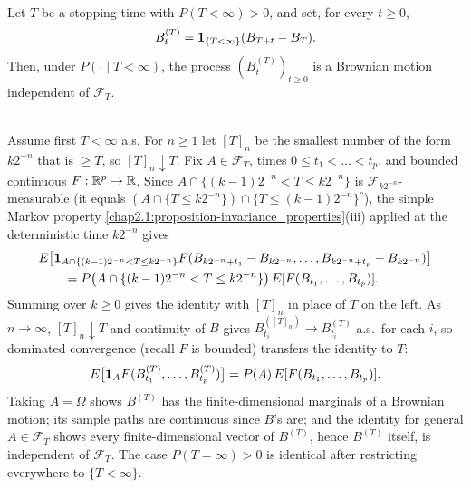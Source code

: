 \begin{theorem} \label{chap2.4:theorem-strong_markov_property}  \\
Let $T$ be a stopping time with $P(T<\infty)>0$, and set, for every $t\ge0$,
$$B_t^{(T)}=\mathbf{1}_{\{T<\infty\}}(B_{T+t}-B_T).$$
Then, under $P(\cdot\mid T<\infty)$, the process $(B_t^{(T)})_{t\ge0}$ is a Brownian motion independent of $\mathcal F_T$.
\end{theorem}
\begin{proofidea}  \\
Assume first $T<\infty$ a.s. For $n\ge1$ let $[T]_n$ be the smallest number of the form $k2^{-n}$ that is $\ge T$, so $[T]_n\downarrow T$. Fix $A\in\mathcal F_T$, times $0\le t_1<\dots<t_p$, and bounded continuous $F:\mathbb{R}^p\to\mathbb{R}$. Since $A\cap\{(k-1)2^{-n}<T\le k2^{-n}\}$ is $\mathcal F_{k2^{-n}}$-measurable (it equals $(A\cap\{T\le k2^{-n}\})\cap\{T\le(k-1)2^{-n}\}^c$), the simple Markov property \ref{chap2.1:proposition-invariance_properties}(iii) applied at the deterministic time $k2^{-n}$ gives
\begin{align*}
&E\big[\mathbf{1}_{A\cap\{(k-1)2^{-n}<T\le k2^{-n}\}}F(B_{k2^{-n}+t_1}-B_{k2^{-n}},\dots,B_{k2^{-n}+t_p}-B_{k2^{-n}})\big] \\
&\qquad=P\big(A\cap\{(k-1)2^{-n}<T\le k2^{-n}\}\big)\,E[F(B_{t_1},\dots,B_{t_p})].
\end{align*}
Summing over $k\ge0$ gives the identity with $[T]_n$ in place of $T$ on the left. As $n\to\infty$, $[T]_n\downarrow T$ and continuity of $B$ gives $B^{([T]_n)}_{t_i}\to B^{(T)}_{t_i}$ a.s.\ for each $i$, so dominated convergence (recall $F$ is bounded) transfers the identity to $T$:
$$E\big[\mathbf{1}_AF(B^{(T)}_{t_1},\dots,B^{(T)}_{t_p})\big]=P(A)\,E[F(B_{t_1},\dots,B_{t_p})].$$
Taking $A=\Omega$ shows $B^{(T)}$ has the finite-dimensional marginals of a Brownian motion; its sample paths are continuous since $B$'s are; and the identity for general $A\in\mathcal F_T$ shows every finite-dimensional vector of $B^{(T)}$, hence $B^{(T)}$ itself, is independent of $\mathcal F_T$. The case $P(T=\infty)>0$ is identical after restricting everywhere to $\{T<\infty\}$.
\end{proofidea}


